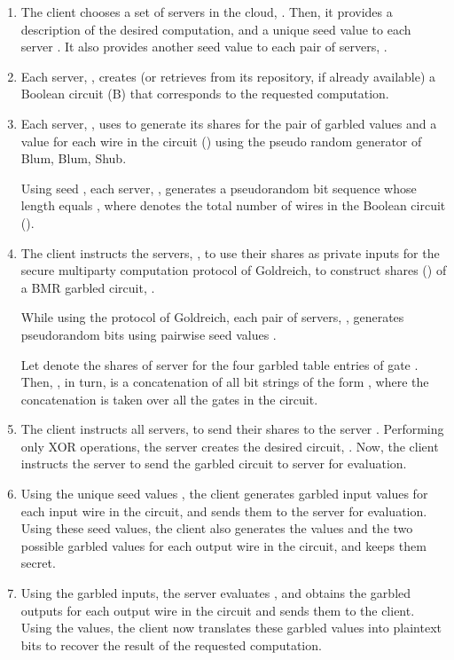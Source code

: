 \documentclass[10pt,journal,cspaper,compsoc]{IEEEtran}
\begin{document}
\begin{enumerate}
    \item{The client chooses a set of  servers in the cloud, . Then, it provides a description of the desired computation, and a unique seed value  to each server . It also provides another seed value  to each pair of servers, .}

    \item{Each server, , creates (or retrieves from its repository, if already available) a Boolean circuit (B) that corresponds to the requested computation.}

    \item{Each server, , uses  to generate its shares for the pair of garbled values and a  value for each wire in the circuit () using the pseudo random generator of Blum, Blum, Shub.

        Using seed , each server, , generates a pseudorandom bit sequence whose length equals , where  denotes the total number of wires in the Boolean circuit ().}

    \item{The client instructs the  servers, , to use their shares as private inputs for the secure multiparty computation protocol of Goldreich, to construct shares () of a BMR garbled circuit, .

        While using the protocol of Goldreich, each pair of servers, , generates pseudorandom bits using pairwise seed values .

        Let  denote the shares of server  for the four garbled table entries of gate . Then, , in turn, is a concatenation of all bit strings of the form , where the concatenation is taken over all the gates in the circuit.}

    \item{The client instructs all  servers,  to send their shares  to the server . Performing only XOR operations, the server  creates the desired circuit, . Now, the client instructs the server  to send the garbled circuit  to server  for evaluation.}

    \item{Using the unique seed values , the client generates garbled input values for each input wire in the circuit, and sends them to the server  for evaluation. Using these seed values, the client also generates the  values and the two possible garbled values for each output wire in the circuit, and keeps them secret.}

    \item{Using the garbled inputs, the server  evaluates , and obtains the garbled outputs for each output wire in the circuit and sends them to the client. Using the  values, the client now translates these garbled values into plaintext bits to recover the result of the requested computation.}


\end{enumerate}
\end{document}
